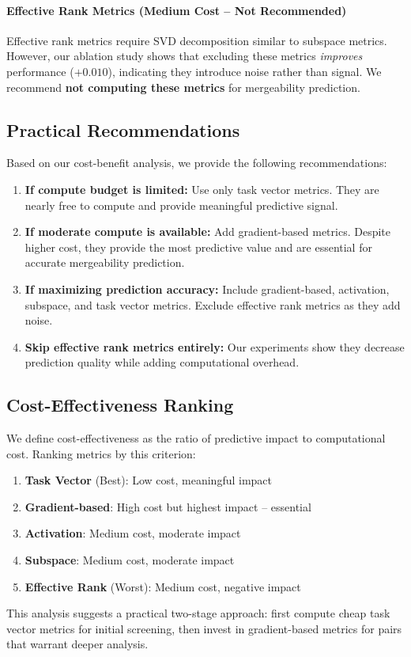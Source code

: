 \paragraph{Effective Rank Metrics (Medium Cost -- Not Recommended)}
Effective rank metrics require SVD decomposition similar to subspace metrics. However, our ablation study shows that excluding these metrics \emph{improves} performance ($+0.010$), indicating they introduce noise rather than signal. We recommend \textbf{not computing these metrics} for mergeability prediction.

\subsection{Practical Recommendations}

Based on our cost-benefit analysis, we provide the following recommendations:

\begin{enumerate}
    \item \textbf{If compute budget is limited:} Use only task vector metrics. They are nearly free to compute and provide meaningful predictive signal.

    \item \textbf{If moderate compute is available:} Add gradient-based metrics. Despite higher cost, they provide the most predictive value and are essential for accurate mergeability prediction.

    \item \textbf{If maximizing prediction accuracy:} Include gradient-based, activation, subspace, and task vector metrics. Exclude effective rank metrics as they add noise.

    \item \textbf{Skip effective rank metrics entirely:} Our experiments show they decrease prediction quality while adding computational overhead.
\end{enumerate}

\subsection{Cost-Effectiveness Ranking}

We define cost-effectiveness as the ratio of predictive impact to computational cost. Ranking metrics by this criterion:

\begin{enumerate}
    \item \textbf{Task Vector} (Best): Low cost, meaningful impact
    \item \textbf{Gradient-based}: High cost but highest impact -- essential
    \item \textbf{Activation}: Medium cost, moderate impact
    \item \textbf{Subspace}: Medium cost, moderate impact
    \item \textbf{Effective Rank} (Worst): Medium cost, negative impact
\end{enumerate}

This analysis suggests a practical two-stage approach: first compute cheap task vector metrics for initial screening, then invest in gradient-based metrics for pairs that warrant deeper analysis.
